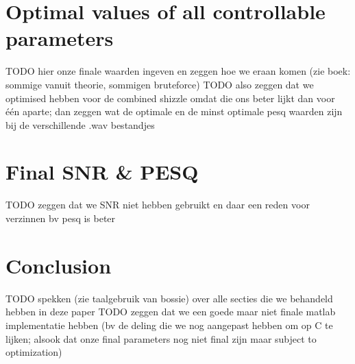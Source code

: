 \documentclass[a4paper]{article}
\begin{document}
\section{Optimal values of all controllable parameters}
TODO hier onze finale waarden ingeven en zeggen hoe we eraan komen (zie boek: sommige vanuit theorie, sommigen bruteforce)
TODO also zeggen dat we optimised hebben voor de combined shizzle omdat die ons beter lijkt dan voor één aparte; dan zeggen wat de optimale en de minst optimale pesq waarden zijn bij de verschillende .wav bestandjes

\section{Final SNR \& PESQ}
TODO zeggen dat we SNR niet hebben gebruikt en daar een reden voor verzinnen bv pesq is beter

\section{Conclusion}
TODO spekken (zie taalgebruik van bossie) over alle secties die we behandeld hebben in deze paper
TODO zeggen dat we een goede maar niet finale matlab implementatie hebben (bv de deling die we nog aangepast hebben om op C te lijken; alsook dat onze final parameters nog niet final zijn maar subject to optimization)
\end{document}
